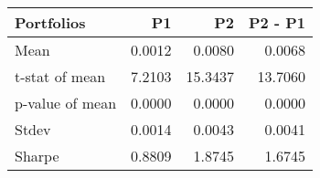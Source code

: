 \begin{tabular}{lrrr}
\toprule
Portfolios & P1 & P2 & P2 - P1 \\
\midrule
Mean & 0.0012 & 0.0080 & 0.0068 \\
t-stat of mean & 7.2103 & 15.3437 & 13.7060 \\
p-value of mean & 0.0000 & 0.0000 & 0.0000 \\
Stdev & 0.0014 & 0.0043 & 0.0041 \\
Sharpe & 0.8809 & 1.8745 & 1.6745 \\
\bottomrule
\end{tabular}
